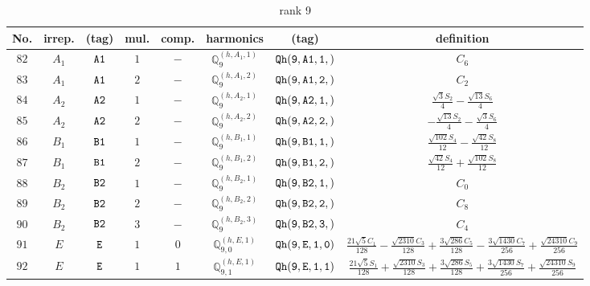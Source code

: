 \documentclass[fleqn,8pt]{jsarticle}
\begin{document}
\begin{table}[ht!]
\begin{center}
\caption{rank 9}
\renewcommand{\arraystretch}{1.3}
\begin{tabular}{cccccccc} \hline \hline
No. & irrep. & (tag) & mul. & comp. & harmonics & (tag) & definition \\ \hline
$ 82 $ & $ A_{1} $ & $ {\tt A1} $ & $ 1 $ & $ - $ & $ \mathbb{Q}_{9}^{(h,A_{1},1)} $ & $ {\tt Qh(9,A1,1,)} $ & $ C_{6} $ \\
$ 83 $ & $ A_{1} $ & $ {\tt A1} $ & $ 2 $ & $ - $ & $ \mathbb{Q}_{9}^{(h,A_{1},2)} $ & $ {\tt Qh(9,A1,2,)} $ & $ C_{2} $ \\
$ 84 $ & $ A_{2} $ & $ {\tt A2} $ & $ 1 $ & $ - $ & $ \mathbb{Q}_{9}^{(h,A_{2},1)} $ & $ {\tt Qh(9,A2,1,)} $ & $ \frac{\sqrt{3} S_{2}}{4} - \frac{\sqrt{13} S_{6}}{4} $ \\
$ 85 $ & $ A_{2} $ & $ {\tt A2} $ & $ 2 $ & $ - $ & $ \mathbb{Q}_{9}^{(h,A_{2},2)} $ & $ {\tt Qh(9,A2,2,)} $ & $ - \frac{\sqrt{13} S_{2}}{4} - \frac{\sqrt{3} S_{6}}{4} $ \\
$ 86 $ & $ B_{1} $ & $ {\tt B1} $ & $ 1 $ & $ - $ & $ \mathbb{Q}_{9}^{(h,B_{1},1)} $ & $ {\tt Qh(9,B1,1,)} $ & $ \frac{\sqrt{102} S_{4}}{12} - \frac{\sqrt{42} S_{8}}{12} $ \\
$ 87 $ & $ B_{1} $ & $ {\tt B1} $ & $ 2 $ & $ - $ & $ \mathbb{Q}_{9}^{(h,B_{1},2)} $ & $ {\tt Qh(9,B1,2,)} $ & $ \frac{\sqrt{42} S_{4}}{12} + \frac{\sqrt{102} S_{8}}{12} $ \\
$ 88 $ & $ B_{2} $ & $ {\tt B2} $ & $ 1 $ & $ - $ & $ \mathbb{Q}_{9}^{(h,B_{2},1)} $ & $ {\tt Qh(9,B2,1,)} $ & $ C_{0} $ \\
$ 89 $ & $ B_{2} $ & $ {\tt B2} $ & $ 2 $ & $ - $ & $ \mathbb{Q}_{9}^{(h,B_{2},2)} $ & $ {\tt Qh(9,B2,2,)} $ & $ C_{8} $ \\
$ 90 $ & $ B_{2} $ & $ {\tt B2} $ & $ 3 $ & $ - $ & $ \mathbb{Q}_{9}^{(h,B_{2},3)} $ & $ {\tt Qh(9,B2,3,)} $ & $ C_{4} $ \\
$ 91 $ & $ E $ & $ {\tt E} $ & $ 1 $ & $ 0 $ & $ \mathbb{Q}_{9,0}^{(h,E,1)} $ & $ {\tt Qh(9,E,1,0)} $ & $ \frac{21 \sqrt{5} C_{1}}{128} - \frac{\sqrt{2310} C_{3}}{128} + \frac{3 \sqrt{286} C_{5}}{128} - \frac{3 \sqrt{1430} C_{7}}{256} + \frac{\sqrt{24310} C_{9}}{256} $ \\
$ 92 $ & $ E $ & $ {\tt E} $ & $ 1 $ & $ 1 $ & $ \mathbb{Q}_{9,1}^{(h,E,1)} $ & $ {\tt Qh(9,E,1,1)} $ & $ \frac{21 \sqrt{5} S_{1}}{128} + \frac{\sqrt{2310} S_{3}}{128} + \frac{3 \sqrt{286} S_{5}}{128} + \frac{3 \sqrt{1430} S_{7}}{256} + \frac{\sqrt{24310} S_{9}}{256} $ \\

\end{tabular}
\end{center}
\end{table}
\end{document}
